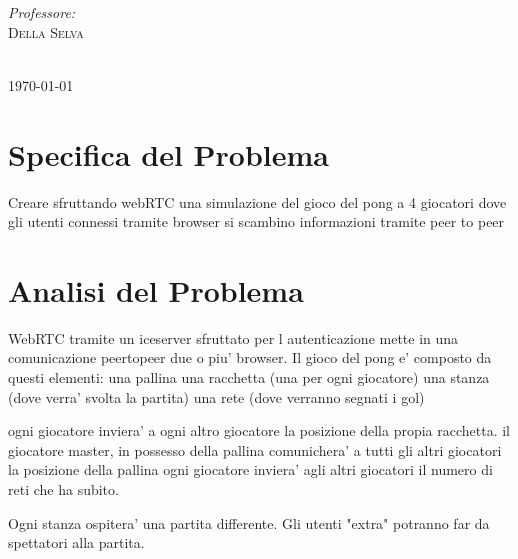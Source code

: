 ﻿\documentclass[11pt, a4paper, titlepage, block]{article}
\begin{document}
\begin{titlepage}
		\begin{minipage}{\textwidth}
			\begin{flushright}
				\emph{Professore:} \\
				 \textsc{Della Selva}\\ %
			\end{flushright}
		\end{minipage}\\[4cm]

		{\today}\\[1cm]



		\newpage
		\tableofcontents
		\newpage

	\end{titlepage}

	\section{Specifica del Problema}
Creare sfruttando webRTC una simulazione del gioco del pong a 4 giocatori dove gli utenti connessi tramite browser si scambino informazioni tramite peer to peer

	\section{Analisi del Problema}
WebRTC tramite un iceserver sfruttato per l autenticazione mette in una comunicazione peertopeer due o piu' browser.
Il gioco del pong e' composto da questi elementi:
una pallina
una racchetta (una per ogni giocatore)
una stanza (dove verra' svolta la partita)
una rete (dove verranno segnati i gol)

ogni giocatore inviera' a ogni altro giocatore la posizione della propia racchetta.
il giocatore master, in possesso della pallina comunichera' a tutti gli altri giocatori la posizione della pallina
ogni giocatore inviera' agli altri giocatori il numero di reti che ha subito.

Ogni stanza ospitera' una partita differente.
Gli utenti "extra" potranno far da spettatori alla partita.
\end{document}
